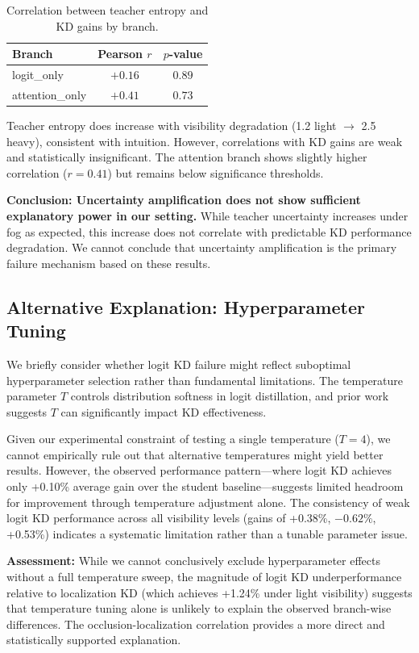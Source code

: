 \begin{table}[htbp]
\centering
\caption{Correlation between teacher entropy and KD gains by branch.}
\label{tab:entropy_corr}
\begin{tabular}{@{}lcc@{}}
\toprule
Branch & Pearson $r$ & $p$-value \\
\midrule
logit\_only & $+0.16$ & $0.89$ \\
attention\_only & $+0.41$ & $0.73$ \\
\bottomrule
\end{tabular}
\end{table}

Teacher entropy does increase with visibility degradation (1.2 light $\to$ 2.5 heavy), consistent with intuition. However, correlations with KD gains are weak and statistically insignificant. The attention branch shows slightly higher correlation ($r=0.41$) but remains below significance thresholds.

\textbf{Conclusion: Uncertainty amplification does not show sufficient explanatory power in our setting.} While teacher uncertainty increases under fog as expected, this increase does not correlate with predictable KD performance degradation. We cannot conclude that uncertainty amplification is the primary failure mechanism based on these results.

\subsection{Alternative Explanation: Hyperparameter Tuning}

We briefly consider whether logit KD failure might reflect suboptimal hyperparameter selection rather than fundamental limitations. The temperature parameter $T$ controls distribution softness in logit distillation, and prior work suggests $T$ can significantly impact KD effectiveness.

Given our experimental constraint of testing a single temperature ($T=4$), we cannot empirically rule out that alternative temperatures might yield better results. However, the observed performance pattern---where logit KD achieves only +0.10\% average gain over the student baseline---suggests limited headroom for improvement through temperature adjustment alone. The consistency of weak logit KD performance across all visibility levels (gains of +0.38\%, $-0.62\%$, +0.53\%) indicates a systematic limitation rather than a tunable parameter issue.

\textbf{Assessment:} While we cannot conclusively exclude hyperparameter effects without a full temperature sweep, the magnitude of logit KD underperformance relative to localization KD (which achieves +1.24\% under light visibility) suggests that temperature tuning alone is unlikely to explain the observed branch-wise differences. The occlusion-localization correlation provides a more direct and statistically supported explanation.

